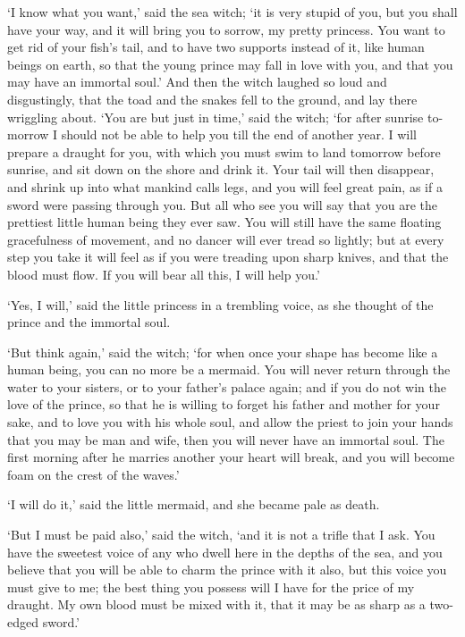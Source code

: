 `I know what you want,' said the sea witch; `it is very stupid
of you, but you shall have your way, and it will bring you to
sorrow, my pretty princess. 
You want to get rid of your fish's tail,
and to have two supports instead of it, like human beings on earth, so
that the young prince may fall in love with you, and that you may have
an immortal soul.' And then the witch laughed so loud and
disgustingly, that the toad and the snakes fell to the ground, and lay
there wriggling about. 
`You are but just in time,' said the witch;
`for after sunrise to-morrow I should not be able to help you till the
end of another year. 
I will prepare a draught for you, with which
you must swim to land tomorrow before sunrise, and sit down on the
shore and drink it. 
Your tail will then disappear, and shrink up
into what mankind calls legs, and you will feel great pain, as if a
sword were passing through you. 
But all who see you will say that
you are the prettiest little human being they ever saw. 
You will still
have the same floating gracefulness of movement, and no dancer will
ever tread so lightly; but at every step you take it will feel as if
you were treading upon sharp knives, and that the blood must flow.
If you will bear all this, I will help you.'

`Yes, I will,' said the little princess in a trembling voice, as
she thought of the prince and the immortal soul.

`But think again,' said the witch; `for when once your shape has
become like a human being, you can no more be a mermaid. 
You will
never return through the water to your sisters, or to your father's
palace again; and if you do not win the love of the prince, so that he
is willing to forget his father and mother for your sake, and to
love you with his whole soul, and allow the priest to join your
hands that you may be man and wife, then you will never have an
immortal soul. 
The first morning after he marries another your heart
will break, and you will become foam on the crest of the waves.'

`I will do it,' said the little mermaid, and she became pale as
death.

`But I must be paid also,' said the witch, `and it is not a trifle
that I ask. 
You have the sweetest voice of any who dwell here in the
depths of the sea, and you believe that you will be able to charm
the prince with it also, but this voice you must give to me; the
best thing you possess will I have for the price of my draught. 
My own
blood must be mixed with it, that it may be as sharp as a two-edged
sword.'

